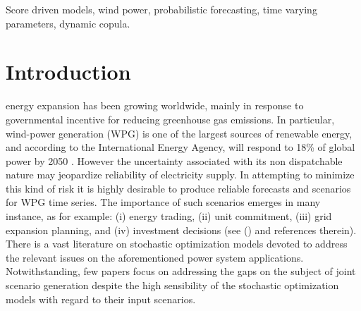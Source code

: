 \documentclass[a4paper]{IEEEtran}
\begin{document}
\begin{IEEEkeywords}
	Score driven models, wind power, probabilistic forecasting, time varying parameters, dynamic copula.
\end{IEEEkeywords}


\section{Introduction}
\label{Introduction}

 energy expansion has been growing worldwide, mainly in response to governmental incentive for reducing greenhouse gas emissions. In particular, wind-power generation (WPG) is one of the largest sources of renewable energy, and according to the International Energy Agency, will respond to 18\% of global power by 2050  \cite{IntEnerAgency}. However the uncertainty associated with its non dispatchable nature may jeopardize reliability of electricity supply. In attempting to minimize this kind of risk it is highly desirable to produce reliable forecasts and scenarios for WPG time series. The importance of such scenarios emerges in many instance, as for example: (i) energy trading, (ii) unit commitment, (iii) grid expansion planning, and (iv) investment decisions (see (\cite{moreiraStreet,jabr2013robust,zhaoguan,Aderson2017}) and references therein). %
There is a vast literature on stochastic optimization models devoted to address the relevant issues on the aforementioned power system applications. Notwithstanding, few papers focus on addressing the gaps on the subject of joint scenario generation despite the high sensibility of the stochastic optimization models with regard to their input scenarios.


\end{document}
